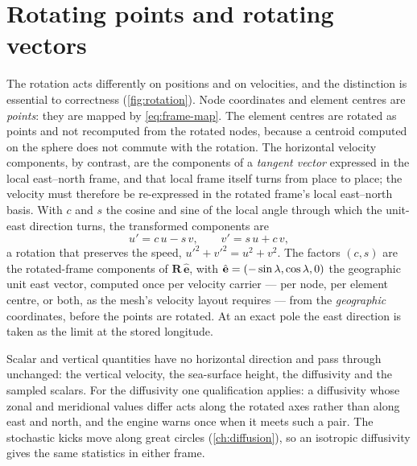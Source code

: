 \section{Rotating points and rotating vectors}\label{sec:frame-vectors}

The rotation acts differently on positions and on velocities, and the distinction is essential to
correctness (\cref{fig:rotation}). Node coordinates and element centres are \emph{points}: they are
mapped by \cref{eq:frame-map}. The element centres are rotated as points and not recomputed from the
rotated nodes, because a centroid computed on the sphere does not commute with the rotation. The
horizontal velocity components, by contrast, are the components of a \emph{tangent vector} expressed in
the local east--north frame, and that local frame itself turns from place to place; the velocity must
therefore be re-expressed in the rotated frame's local east--north basis. With $c$ and $s$ the cosine
and sine of the local angle through which the unit-east direction turns, the transformed components are
\begin{equation}\label{eq:vec-rot}
  u' = c\,u - s\,v, \qquad v' = s\,u + c\,v,
\end{equation}
a rotation that preserves the speed, $u'^2+v'^2=u^2+v^2$. The factors $(c,s)$ are the rotated-frame
components of $\mathbf{R}\,\hat{\mathbf{e}}$, with $\hat{\mathbf{e}}=(-\sin\lambda,\cos\lambda,0)$ the geographic
unit east vector, computed once per velocity carrier --- per node, per element centre, or both, as the
mesh's velocity layout requires --- from the \emph{geographic} coordinates, before the points are
rotated. At an exact pole the east direction is taken as the limit at the stored longitude.

Scalar and vertical quantities have no horizontal direction and pass through unchanged: the vertical
velocity, the sea-surface height, the diffusivity and the sampled scalars. For the diffusivity one
qualification applies: a diffusivity whose zonal and meridional values differ acts along the rotated
axes rather than along east and north, and the engine warns once when it meets such a pair. The
stochastic kicks move along great circles (\cref{ch:diffusion}), so an isotropic diffusivity gives the
same statistics in either frame.

